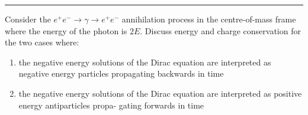 \noindent\rule{7in}{1.5pt}


\begin{problem}{4.11}
Consider the $e^+e^-\to\gamma\to e^+e^-$ annihilation process in the centre-of-mass frame where the energy of the photon is $2E$.
Discuss energy and charge conservation for the two cases where:
\begin{enumerate}[label=(\alph*)]
    \item the negative energy solutions of the Dirac equation are interpreted as negative energy particles propagating backwards in time
    \item the negative energy solutions of the Dirac equation are interpreted as positive energy antiparticles propa- gating forwards in time
\end{enumerate}
\end{problem}
